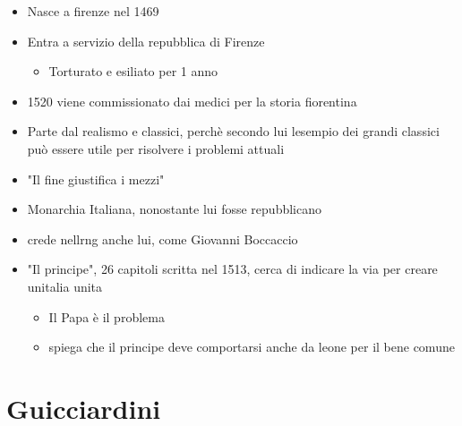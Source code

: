 \documentclass[
]{article}
\providecommand{\tightlist}{%
  \setlength{\itemsep}{0pt}\setlength{\parskip}{0pt}}
\begin{document}
\begin{itemize}
\tightlist
\item
  Nasce a firenze nel 1469
\item
  Entra a servizio della repubblica di Firenze

  \begin{itemize}
  \tightlist
  \item
    Torturato e esiliato per 1 anno
  \end{itemize}
\item
  1520 viene commissionato dai medici per la storia fiorentina
\item
  Parte dal realismo e classici, perchè secondo lui
  l\textquotesingle esempio dei grandi classici può essere utile per
  risolvere i problemi attuali
\item
  "Il fine giustifica i mezzi"
\item
  Monarchia Italiana, nonostante lui fosse repubblicano
\item
  crede nell\textquotesingle rng anche lui, come Giovanni Boccaccio
\item
  "Il principe", 26 capitoli scritta nel 1513, cerca di indicare la via
  per creare un\textquotesingle italia unita

  \begin{itemize}
  \tightlist
  \item
    Il Papa è il problema
  \item
    spiega che il principe deve comportarsi anche da leone per il bene
    comune
  \end{itemize}
\end{itemize}

\hypertarget{guicciardini}{%
\section{Guicciardini}\label{guicciardini}}
\end{document}
